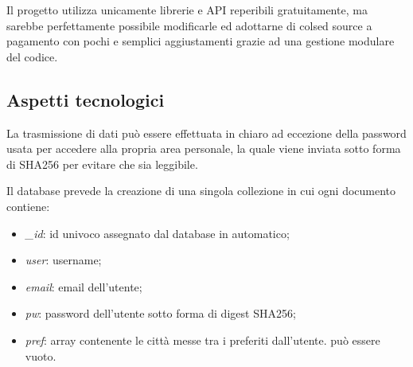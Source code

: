 \vspace{5mm}

Il progetto utilizza unicamente librerie e API reperibili gratuitamente, ma sarebbe perfettamente possibile modificarle ed 
adottarne di colsed source a pagamento con pochi e semplici aggiustamenti grazie ad una gestione modulare del codice.


\subsection{Aspetti tecnologici}

La trasmissione di dati può essere effettuata in chiaro ad eccezione della password usata per accedere alla propria area 
personale, la quale viene inviata sotto forma di SHA256 per evitare che sia leggibile.

\vspace{5mm}

Il database prevede la creazione di una singola collezione in cui ogni documento contiene:
\begin{itemize}
    \item \emph{\_id}: id univoco assegnato dal database in automatico;
    \item \emph{user}: username;
    \item \emph{email}: email dell'utente;
    \item \emph{pw}: password dell'utente sotto forma di digest SHA256;
    \item \emph{pref}: array contenente le città messe tra i preferiti dall'utente. può essere vuoto.
\end{itemize}

\vspace{5mm}

